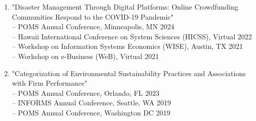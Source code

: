 \documentclass[margin,line]{resume}
\begin{document}
\begin{resume}
\begin{enumerate}[topsep=0pt, leftmargin=*]
 	     \item "Disaster Management Through Digital Platforms: Online Crowdfunding Communities Respond to the COVID-19 Pandemic"\\[0.3em]
 	         -- POMS Annual Conference, Minneapolis, MN \hfill   2024\\
             -- Hawaii International Conference on System Sciences (HICSS), Virtual \hfill 2022\\
 	           -- Workshop on Information Systems Economics (WISE), Austin, TX \hfill 2021\\
 	           -- Workshop on e-Business (WeB), Virtual \hfill 2021\\
              
 	     \item "Categorization of Environmental Sustainability Practices and Associations with Firm Performance"\\[0.3em]
  	     -- POMS Annual Conference, Orlando, FL \hfill   2023\\
 	           -- INFORMS Annual Conference, Seattle, WA \hfill2019\\
 	           -- POMS Annual Conference, Washington DC \hfill2019

 	           

 	  \end{enumerate}

         

\end{resume}
\end{document}
